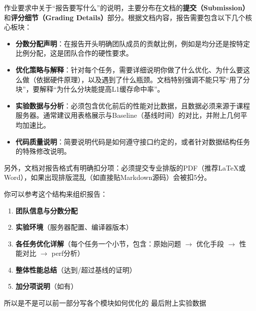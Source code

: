 \documentclass[11pt, a4paper]{article}
\begin{document}
\begin{aibox}
作业要求中关于“报告要写什么”的说明，主要分布在文档的\textbf{提交（Submission）}和\textbf{评分细节（Grading Details）}部分。根据文档内容，报告需要包含以下几个核心板块：

\begin{itemize}
    \item \textbf{分数分配声明}：在报告开头明确团队成员的贡献比例，例如是均分还是按特定比例分配，这是团队合作的硬性要求。
    \item \textbf{优化策略与解释}：针对每个任务，需要详细说明你做了什么优化、为什么要这么做（依据硬件原理），以及遇到了什么瓶颈。文档特别强调不能只写“用了分块”，要解释“为什么分块能提高L1缓存命中率”。
    \item \textbf{实验数据与分析}：必须包含优化前后的性能对比数据，且数据必须来源于课程服务器。通常建议用表格展示与Baseline（基线时间）的对比，并附上几何平均加速比。
    \item \textbf{代码质量说明}：简要说明代码是如何遵守接口约定的，或者针对数据结构任务的特殊修改说明。
\end{itemize}

另外，文档对报告格式有明确扣分项：必须提交专业排版的PDF（推荐LaTeX或Word），如果出现排版混乱（如直接贴Markdown源码）会被扣5分。

你可以参考这个结构来组织报告：
\begin{enumerate}
    \item \textbf{团队信息与分数分配}
    \item \textbf{实验环境}（服务器配置、编译器版本）
    \item \textbf{各任务优化详解}（每个任务一个小节，包含：原始问题 $\rightarrow$ 优化手段 $\rightarrow$ 性能对比 $\rightarrow$ perf分析）
    \item \textbf{整体性能总结}（达到/超过基线的证明）
    \item \textbf{加分项说明}（如有）
\end{enumerate}
\end{aibox}

\vspace{1.5em}

\begin{userbox}
所以是不是可以前一部分写各个模块如何优化的 最后附上实验数据
\end{userbox}
\end{document}
